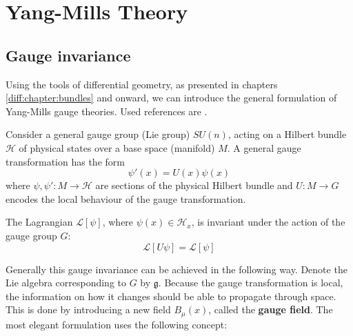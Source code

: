 \chapter{Yang-Mills Theory}

\section{Gauge invariance}

	Using the tools of differential geometry, as presented in chapters \ref{diff:chapter:bundles} and onward, we can introduce the general formulation of Yang-Mills gauge theories. Used references are \cite{principal_bundles,sen_nash,schuller, gauge1}.

	Consider a general gauge group (Lie group) $SU(n)$, acting on a Hilbert bundle $\mathcal{H}$ of physical states over a base space (manifold) $M$. A general gauge transformation has the form
	\begin{equation}
		\label{qft:gauge_transformation}
		\psi'(x) = U(x)\psi(x)
	\end{equation}
	where $\psi, \psi':M\rightarrow\mathcal{H}$ are sections of the physical Hilbert bundle and $U:M\rightarrow G$ encodes the local behaviour of the gauge transformation.
	
	\begin{theorem}
		The Lagrangian $\mathcal{L}[\psi]$, where $\psi(x)\in\mathcal{H}_x$, is invariant under the action of the gauge group $G$:
		\begin{equation}
			\mathcal{L}[U\psi] = \mathcal{L}[\psi]
		\end{equation}
	\end{theorem}
	
	Generally this gauge invariance can be achieved in the following way. Denote the Lie algebra corresponding to $G$ by $\mathfrak{g}$. Because the gauge transformation is local, the information on how it changes should be able to propagate through space. This is done by introducing a new field $B_\mu(x)$, called the \textbf{gauge field}. The most elegant formulation uses the following concept:
	

